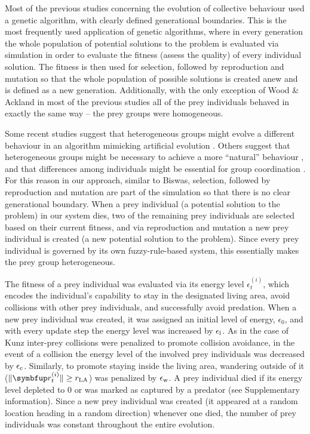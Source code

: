 Most of the previous studies concerning the evolution of collective behaviour \cite{kunz2006prey,olson2013predator,olson2016evolution,wood2007evolving} used a genetic algorithm, with clearly defined generational boundaries. This is the most frequently used application of genetic algorithms, where in every generation the whole population of potential solutions to the problem is evaluated via simulation in order to evaluate the fitness (assess the quality) of every individual solution. The fitness is then used for selection, followed by reproduction and mutation so that the whole population of possible solutions is created anew and is defined as a new generation. Additionally, with the only exception of Wood \& Ackland \cite{wood2007evolving} in most of the previous studies \cite{kunz2006prey,olson2013predator,olson2016evolution} all of the prey individuals behaved in exactly the same way -- the prey groups were homogeneous.

Some recent studies suggest that heterogeneous groups might evolve a different behaviour in an algorithm mimicking artificial evolution \cite{olson2015exploring}. Others suggest that heterogeneous groups might be necessary to achieve a more ``natural'' behaviour \cite{demsar2013family}, and that differences among individuals might be essential for group coordination \cite{marras2012information,marras2013schooling}. For this reason in our approach, similar to Biswas\etal \cite{biswas2014causes}, selection, followed by reproduction and mutation are part of the simulation so that there is no clear generational boundary. When a prey individual (a potential solution to the problem) in our system dies, two of the remaining prey individuals are selected based on their current fitness, and via reproduction and mutation a new prey individual is created (a new potential solution to the problem). Since every prey individual is governed by its own fuzzy-rule-based system, this essentially makes the prey group heterogeneous.

The fitness of a prey individual was evaluated via its energy level $\epsilon^{(i)}_t$, which encodes the individual's capability to stay in the designated living area, avoid collisions with other prey individuals, and successfully avoid predation. When a new prey individual was created, it was assigned an initial level of energy, $\epsilon_0$, and with every update step the energy level was increased by $\epsilon_\textnormal{l}$. As in the case of Kunz\etal \cite{kunz2006prey} inter-prey collisions were penalized to promote collision avoidance, \ie in the event of a collision the energy level of the involved prey individuals was decreased by $\epsilon_\textnormal{c}$. Similarly, to promote staying inside the living area, wandering outside of it (\ie $\|\vec{r}^{(i)}_t\| \geq r_\textnormal{LA}$) was penalized by $\epsilon_\textnormal{w}$. A prey individual died if its energy level depleted to 0 or was marked as captured by a predator (see Supplementary information). Since a new prey individual was created (\ie it appeared at a random location heading in a random direction) whenever one died, the number of prey individuals was constant throughout the entire evolution.

